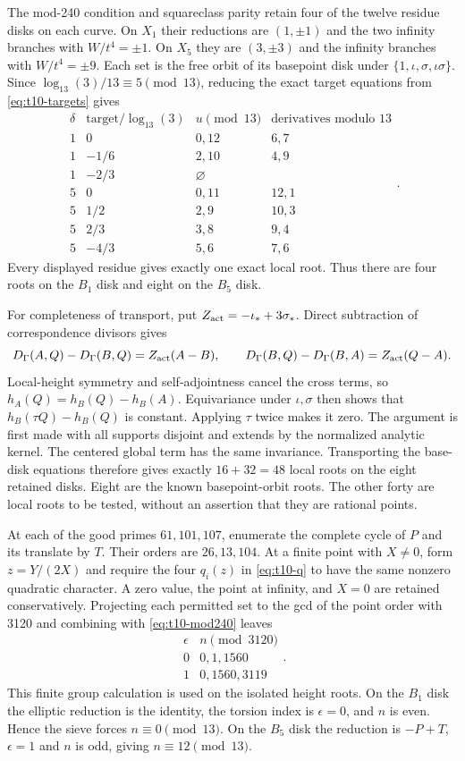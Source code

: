 The mod-240 condition and squareclass parity retain four of the twelve
residue disks on each curve. On $X_1$ their reductions are
$(1,\pm1)$ and the two infinity branches with $W/t^4=\pm1$.
On $X_5$ they are $(3,\pm3)$ and the infinity branches with
$W/t^4=\pm9$. Each set is the free orbit of its basepoint disk under
$\{1,\iota,\sigma,\iota\sigma\}$.
Since $\log_{13}(3)/13\equiv5\pmod{13}$, reducing the exact target
equations from \eqref{eq:t10-targets} gives
\[
\begin{array}{c|c|c|c}
\delta&\text{target}/\log_{13}(3)&u\pmod{13}&
        \text{derivatives modulo }13\\ \hline
1&0&0,12&6,7\\
1&-1/6&2,10&4,9\\
1&-2/3&\varnothing&\\ \hline
5&0&0,11&12,1\\
5&1/2&2,9&10,3\\
5&2/3&3,8&9,4\\
5&-4/3&5,6&7,6
\end{array}.
\]
Every displayed residue gives exactly one exact local root. Thus there
are four roots on the $B_1$ disk and eight on the $B_5$ disk.

For completeness of transport, put
$Z_{\rm act}=-\iota_*+3\sigma_*$. Direct subtraction of correspondence
divisors gives
\[
 D_\Gamma(A,Q)-D_\Gamma(B,Q)=Z_{\rm act}(A-B),\qquad
 D_\Gamma(B,Q)-D_\Gamma(B,A)=Z_{\rm act}(Q-A).
\]
Local-height symmetry and self-adjointness cancel the cross terms,
so $h_A(Q)=h_B(Q)-h_B(A)$. Equivariance under $\iota,\sigma$
then shows that $h_B(\tau Q)-h_B(Q)$ is constant. Applying
$\tau$ twice makes it zero. The argument is first made with all
supports disjoint and extends by the normalized analytic kernel.
The centered global term has the same invariance. Transporting the
base-disk equations therefore gives exactly $16+32=48$ local roots
on the eight retained disks. Eight are the known basepoint-orbit
roots. The other forty are local roots to be tested, without an
assertion that they are rational points.

At each of the good primes $61,101,107$, enumerate the complete cycle
of $P$ and its translate by $T$. Their orders are $26,13,104$.
At a finite point with $X\ne0$, form $z=Y/(2X)$ and require the four
$q_i(z)$ in \eqref{eq:t10-q} to have the same nonzero quadratic
character. A zero value, the point at infinity, and $X=0$ are retained
conservatively. Projecting each permitted set to the gcd of the point
order with 3120 and combining with \eqref{eq:t10-mod240} leaves
\[
\begin{array}{c|c}
\epsilon&n\pmod{3120}\\ \hline
0&0,1,1560\\
1&0,1560,3119
\end{array}.
\]
This finite group calculation is used on the isolated height roots.
On the $B_1$ disk the elliptic reduction is the identity, the torsion
index is $\epsilon=0$, and $n$ is even. Hence the sieve forces
$n\equiv0\pmod{13}$. On the $B_5$ disk the reduction is $-P+T$,
$\epsilon=1$ and $n$ is odd, giving $n\equiv12\pmod{13}$.


